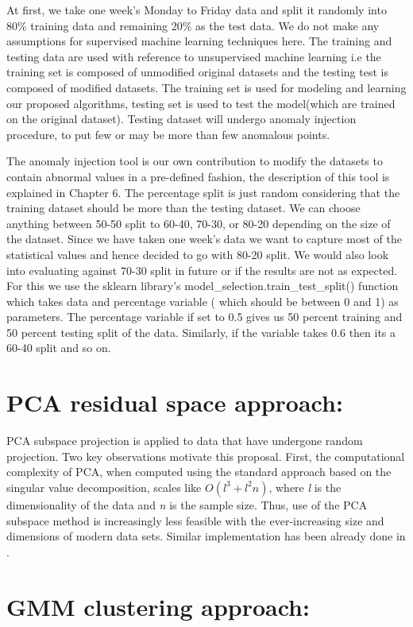 At first, we take one week's Monday to Friday data and split it randomly into 80\% training data and remaining 20\% as the test data. We do not make any assumptions for supervised machine learning techniques here. The training and testing data are used with reference to unsupervised machine learning i.e the training set is composed of unmodified original datasets and the testing test is composed of modified datasets. The training set is used for modeling and learning our proposed algorithms, testing set is used to test the model(which are trained on the original dataset). Testing dataset will undergo anomaly injection procedure, to put few or may be more than few anomalous points. 

The anomaly injection tool is our own contribution to modify the datasets to contain abnormal values in a pre-defined fashion, the description of this tool is explained in Chapter 6. The percentage split is just random considering that the training dataset should be more than the testing dataset. We can choose anything between 50-50 split to 60-40, 70-30, or 80-20 depending on the size of the dataset. Since we have taken one week's data we want to capture most of the statistical values and hence decided to go with 80-20 split. We would also look into evaluating against 70-30 split in future or if the results are not as expected. For this we use the sklearn library's model\_selection.train\_test\_split() function which takes data and percentage variable ( which should be between 0 and 1) as parameters. The percentage variable if set to 0.5 gives us 50 percent training and 50 percent testing split of the data. Similarly, if the variable takes 0.6 then its a 60-40 split and so on. \\

\section{PCA residual space approach:}
PCA subspace projection is applied to data that have undergone random projection. Two key observations motivate this proposal. First, the computational complexity of PCA, when computed using the standard approach based on the singular value decomposition, scales like $O(l^3 + l^2n)$, where \textit{l} is the dimensionality of the data and \textit{n} is the sample size. Thus, use of the PCA subspace method is increasingly less feasible with the ever-increasing size and dimensions of modern data sets. Similar implementation has been already done in \cite{geijerlog}. 
\\
\section{GMM clustering approach:}

\label{sec:Impl}